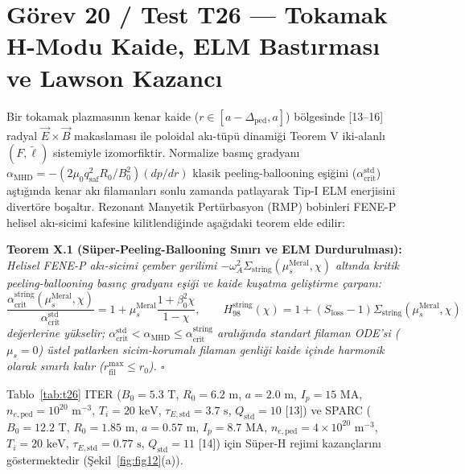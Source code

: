 \documentclass[12pt,a4paper]{article}
\begin{document}
\section{Görev 20 / Test T26 --- Tokamak H-Modu Kaide, ELM Bastırması ve Lawson Kazancı}

Bir tokamak plazmasının kenar kaide ($r\in[a-\Delta_{\mathrm{ped}},a]$) bölgesinde [13--16] radyal $\vec{E}\times\vec{B}$ makaslaması ile poloidal akı-tüpü dinamiği Teorem V iki-alanlı $(F,\tilde{\ell})$ sistemiyle izomorfiktir. Normalize basınç gradyanı $\alpha_{\mathrm{MHD}} = -(2\mu_0 q_{\mathrm{saf}}^2 R_0/B_0^2)(dp/dr)$ klasik peeling-ballooning eşiğini ($\alpha_{\mathrm{crit}}^{\mathrm{std}}$) aştığında kenar akı filamanları sonlu zamanda patlayarak Tip-I ELM enerjisini divertöre boşaltır. Rezonant Manyetik Pertürbasyon (RMP) bobinleri FENE-P helisel akı-sicimi kafesine kilitlendiğinde aşağıdaki teorem elde edilir:

\textbf{Teorem X.1 (Süper-Peeling-Ballooning Sınırı ve ELM Durdurulması):} \textit{Helisel FENE-P akı-sicimi çember gerilimi $-\omega_A^2\Sigma_{\mathrm{string}}(\mu_s^{\mathrm{Meral}},\chi)$ altında kritik peeling-ballooning basınç gradyanı eşiği ve kaide kuşatma geliştirme çarpanı:}
\begin{equation}
\boxed{\frac{\alpha_{\mathrm{crit}}^{\mathrm{string}}(\mu_s^{\mathrm{Meral}},\chi)}{\alpha_{\mathrm{crit}}^{\mathrm{std}}}
= 1 + \mu_s^{\mathrm{Meral}}\frac{1+\beta_0^2\chi}{1-\chi},
\qquad
H_{98}^{\mathrm{string}}(\chi)
= 1 + \left(S_{\mathrm{loss}} - 1\right)\Sigma_{\mathrm{string}}(\mu_s^{\mathrm{Meral}},\chi)}
\label{eq:t26_alpha}
\end{equation}
\textit{değerlerine yükselir; $\alpha_{\mathrm{crit}}^{\mathrm{std}} < \alpha_{\mathrm{MHD}} \le \alpha_{\mathrm{crit}}^{\mathrm{string}}$ aralığında standart filaman ODE'si ($\mu_s=0$) üstel patlarken sicim-korumalı filaman genliği kaide içinde harmonik olarak sınırlı kalır ($r_{\mathrm{fil}}^{\max} \le r_0$). $\square$}

Tablo~\ref{tab:t26} ITER ($B_0=5.3\text{ T}$, $R_0=6.2\text{ m}$, $a=2.0\text{ m}$, $I_p=15\text{ MA}$, $n_{e,\mathrm{ped}}=10^{20}\text{ m}^{-3}$, $T_i=20\text{ keV}$, $\tau_{E,\mathrm{std}}=3.7\text{ s}$, $Q_{\mathrm{std}}=10$ [13]) ve SPARC ($B_0=12.2\text{ T}$, $R_0=1.85\text{ m}$, $a=0.57\text{ m}$, $I_p=8.7\text{ MA}$, $n_{e,\mathrm{ped}}=4\times 10^{20}\text{ m}^{-3}$, $T_i=20\text{ keV}$, $\tau_{E,\mathrm{std}}=0.77\text{ s}$, $Q_{\mathrm{std}}=11$ [14]) için Süper-H rejimi kazançlarını göstermektedir (Şekil~\ref{fig:fig12}(a)).
\end{document}
